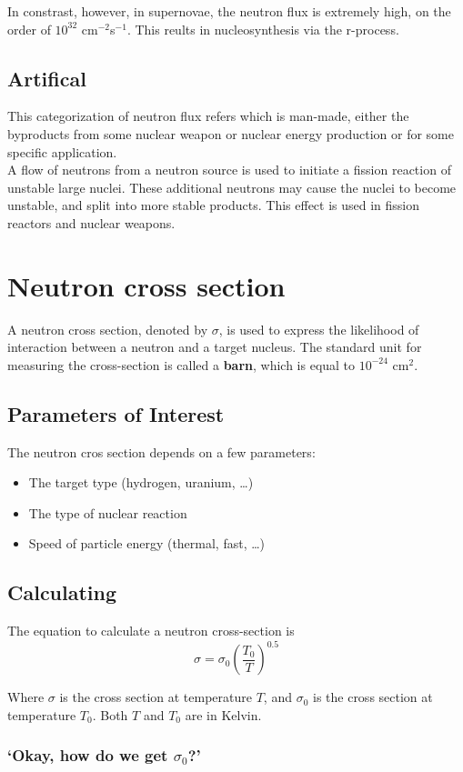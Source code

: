 \documentclass{article}
\begin{document}
\begin{multicols*}{2}
    In constrast, however, in supernovae, the neutron flux is extremely high,
    on the order of $10^{32}$ cm$^{-2}$s$^{-1}$. This reults in nucleosynthesis
    via the r-process.
    \subsection{Artifical}
    This categorization of neutron flux refers which is man-made, either the
    byproducts from some nuclear weapon or nuclear energy production or for
    some specific application.\\

    A flow of neutrons from a neutron source is used to initiate a fission reaction
    of unstable large nuclei. These additional neutrons may cause the nuclei to
    become unstable, and split into more stable products. This effect is used
    in fission reactors and nuclear weapons.
    \section{Neutron cross section}
    A neutron cross section, denoted by $\sigma$, is used to express the likelihood
    of interaction between a neutron and a target nucleus. The standard unit for
    measuring the cross-section is called a \textbf{barn}, which is equal to
    $10^{-24}$ cm$^{2}$.

    \subsection{Parameters of Interest}
    The neutron cros section depends on a few parameters:
    \begin{itemize}
      \item The target type (hydrogen, uranium, \ldots)
      \item The type of nuclear reaction
      \item Speed of particle energy (thermal, fast, \ldots)
    \end{itemize}
    \subsection{Calculating}
    The equation to calculate a neutron cross-section is
    \[
      \sigma = \sigma_{0}\left( \frac{T_0}{T} \right)^{0.5}
    \]

    Where $\sigma$ is the cross section at temperature $T$, and $\sigma_0$ is
    the cross section at temperature $T_0$. Both $T$ and $T_0$ are in Kelvin.

    \subsubsection{`Okay, how do we get $\sigma_0$?'}
    
  \end{multicols*}
\end{document}
